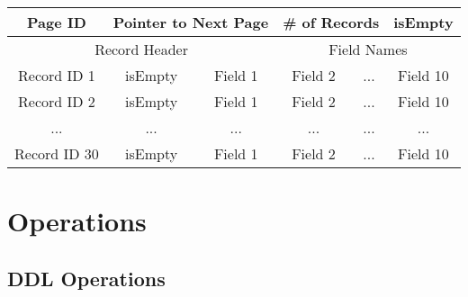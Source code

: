 \documentclass[12pt,a4paper]{article}
\begin{document}
        \begin{table}[h!]
            \begin{center}
                \begin{tabular}{ | c | c | c | c | c | c | }
                \hline
                    \multicolumn{1}{||c|}{Page ID} &
                    \multicolumn{2}{|c|}{Pointer to Next Page} &
                    \multicolumn{2}{|c|}{\# of Records} &
                    \multicolumn{1}{|c||}{isEmpty} \\
                \hline
                
                    \multicolumn{3}{||c|}{Record Header} &
                        \multicolumn{3}{|c||}{Field Names} \\
                \hline
                \hline
                Record ID 1 & isEmpty & Field 1 & Field 2 & ... & Field 10 \\
                \hline
                Record ID 2 & isEmpty & Field 1 & Field 2 & ... & Field 10 \\
                \hline
                ... & ... & ... & ... & ... & ... \\
                \hline
                Record ID 30 & isEmpty & Field 1 & Field 2 & ... & Field 10 \\
                \hline
                \end{tabular}
            \end{center}
    
    \end{table}

\section{Operations}
    \subsection{DDL Operations}
\end{document}
